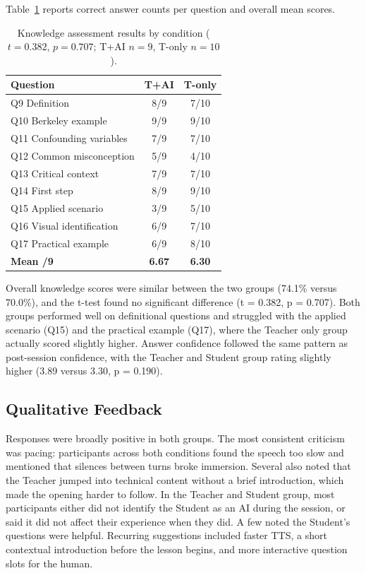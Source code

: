 Table~\ref{tab:knowledge} reports correct answer counts per question and overall mean scores.

\begin{table}[H]
\centering
\footnotesize
\setlength{\tabcolsep}{4pt}
\begin{tabular}{lcc}
\toprule
\textbf{Question} & \textbf{T+AI} & \textbf{T-only} \\
\midrule
Q9  Definition              & 8/9  & 7/10 \\
Q10 Berkeley example        & 9/9  & 9/10 \\
Q11 Confounding variables   & 7/9  & 7/10 \\
Q12 Common misconception    & 5/9  & 4/10 \\
Q13 Critical context        & 7/9  & 7/10 \\
Q14 First step              & 8/9  & 9/10 \\
Q15 Applied scenario        & 3/9  & 5/10 \\
Q16 Visual identification   & 6/9  & 7/10 \\
Q17 Practical example       & 6/9  & 8/10 \\
\midrule
\textbf{Mean /9}            & \textbf{6.67} & \textbf{6.30} \\
\bottomrule
\end{tabular}
\caption{Knowledge assessment results by condition ($t=0.382$, $p=0.707$; T+AI $n=9$, T-only $n=10$).}
\label{tab:knowledge}
\end{table}

Overall knowledge scores were similar between the two groups (74.1\% versus 70.0\%), and the t-test found no significant difference (t = 0.382, p = 0.707). Both groups performed well on definitional questions and struggled with the applied scenario (Q15) and the practical example (Q17), where the Teacher only group actually scored slightly higher. Answer confidence followed the same pattern as post-session confidence, with the Teacher and Student group rating slightly higher (3.89 versus 3.30, p = 0.190).

\subsection{Qualitative Feedback}

Responses were broadly positive in both groups. The most consistent criticism was pacing: participants across both conditions found the speech too slow and mentioned that silences between turns broke immersion. Several also noted that the Teacher jumped into technical content without a brief introduction, which made the opening harder to follow. In the Teacher and Student group, most participants either did not identify the Student as an AI during the session, or said it did not affect their experience when they did. A few noted the Student's questions were helpful. Recurring suggestions included faster TTS, a short contextual introduction before the lesson begins, and more interactive question slots for the human.

